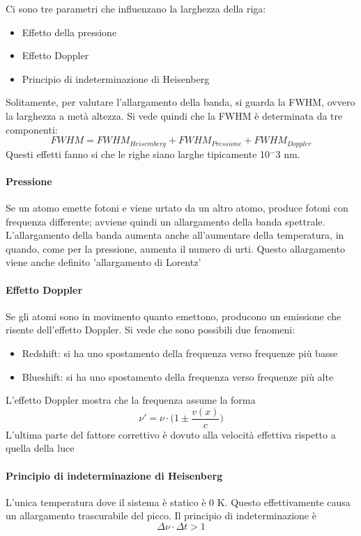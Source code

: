 Ci sono tre parametri che influenzano la larghezza della riga:
\begin{itemize}
\item Effetto della pressione
\item Effetto Doppler
\item Principio di indeterminazione di Heisenberg
\end{itemize}

Solitamente, per valutare l'allargamento della banda, si guarda la FWHM, ovvero la larghezza a metà altezza.
Si vede quindi che la FWHM è determinata da tre componenti:
\[
FWHM = FWHM_{Heisemberg} + FWHM_{Pressione} + FWHM_{Doppler}
\]
Questi effetti fanno si che le righe siano larghe tipicamente 10$^-3$ nm.
\paragraph{Pressione}
Se un atomo emette fotoni e viene urtato da un altro atomo, produce fotoni con frequenza differente; avviene quindi un allargamento della banda spettrale.
L'allargamento della banda aumenta anche all'aumentare della temperatura, in quando, come per la pressione, aumenta il numero di urti.
Questo allargamento viene anche definito 'allargamento di Lorentz'

\paragraph{Effetto Doppler}
Se gli atomi sono in movimento quanto emettono, producono un emissione che risente dell'effetto Doppler.
Si vede che sono possibili due fenomeni:
\begin{itemize}
\item Redshift: si ha uno spostamento della frequenza verso frequenze più basse
\item Blueshift: si ha uno spostamento della frequenza verso frequenze più alte
\end{itemize}


L'effetto Doppler mostra che la frequenza assume la forma
\[
\nu' = \nu \cdot \biggl(1 \pm \frac{v(x)}{c}\biggr)
\]
L'ultima parte del fattore correttivo è dovuto alla velocità effettiva rispetto a quella della luce

\paragraph{Principio di indeterminazione di Heisenberg}
L'unica temperatura dove il sistema è statico è 0 K. Questo effettivamente causa un allargamento trascurabile del picco.
Il principio di indeterminazione è
\[
\Delta \nu \cdot \Delta t > 1
\]

